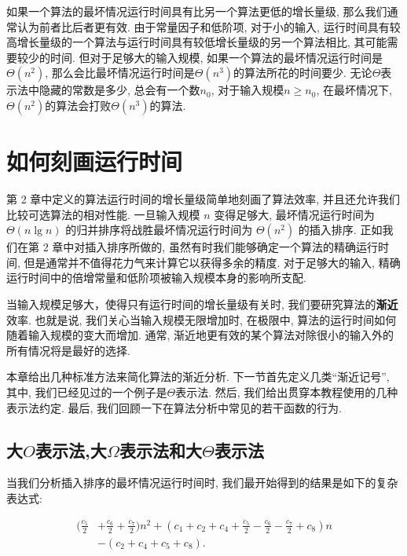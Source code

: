 \documentclass[oneside,10pt,fontset=none]{ctexbook}
\numberwithin{definition}{chapter}
\numberwithin{theorem}{chapter}
\numberwithin{lemma}{chapter}
\begin{document}
如果一个算法的最坏情况运行时间具有比另一个算法更低的增长量级, 那么我们通常认为前者比后者更有效. 由于常量因子和低阶项, 对于小的输入, 运行时间具有较高增长量级的一个算法与运行时间具有较低增长量级的另一个算法相比, 其可能需要较少的时间. 但对于足够大的输入规模, 如果一个算法的最坏情况运行时间是$\Theta(n^2)$, 那么会比最坏情况运行时间是$\Theta(n^3)$的算法所花的时间要少. 无论$\Theta$表示法中隐藏的常数是多少, 总会有一个数$n_0$, 对于输入规模$n\geq n_0$, 在最坏情况下, $\Theta(n^2)$的算法会打败$\Theta(n^3)$的算法.

\section{如何刻画运行时间}

第 2 章中定义的算法运行时间的增长量级简单地刻画了算法效率, 并且还允许我们比较可选算法的相对性能. 一旦输入规模 $n$ 变得足够大, 最坏情况运行时间为 $\Theta(n\lg{n})$ 的归并排序将战胜最坏情况运行时间为 $\Theta(n^2)$ 的插入排序. 正如我们在第 2 章中对插入排序所做的, 虽然有时我们能够确定一个算法的精确运行时间, 但是通常并不值得花力气来计算它以获得多余的精度. 对于足够大的输入, 精确运行时间中的倍增常量和低阶项被输入规模本身的影响所支配.

当输入规模足够大，使得只有运行时间的增长量级有关时, 我们要研究算法的\textbf{渐近}效率. 也就是说, 我们关心当输入规模无限增加时, 在极限中, 算法的运行时间如何随着输入规模的变大而增加. 通常, 渐近地更有效的某个算法对除很小的输入外的所有情况将是最好的选择.

本章给出几种标准方法来简化算法的渐近分析. 下一节首先定义几类``渐近记号'', 其中, 我们已经见过的一个例子是$\Theta$表示法. 然后, 我们给出贯穿本教程使用的几种表示法约定. 最后, 我们回顾一下在算法分析中常见的若干函数的行为.

\subsection{大$O$表示法,大$\Omega$表示法和大$\Theta$表示法}

当我们分析插入排序的最坏情况运行时间时, 我们最开始得到的结果是如下的复杂表达式:

\begin{equation*}\begin{split}
(\frac{c_5}{2} &+ \frac{c_6}{2}+\frac{c_7}{2})n^2+(c_1+c_2+c_4+\frac{c_5}{2}-\frac{c_6}{2}-\frac{c_7}{2}+c_8)n \\
&- (c_2+c_4+c_5+c_8).
\end{split}\end{equation*}
\end{document}
